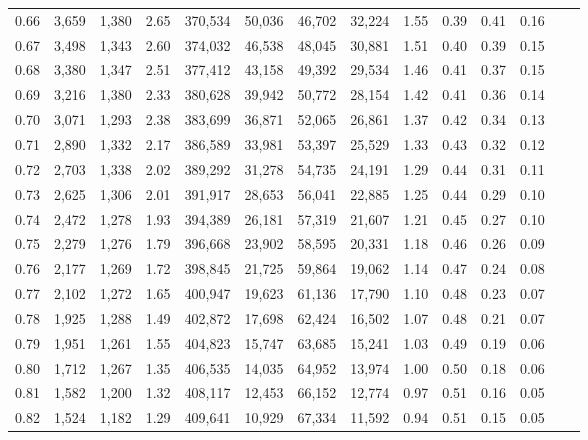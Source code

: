 \begin{tabular}{rrrrrrrrrrrrrr}
0.66 &  3,659 &  1,380 &    2.65 &  370,534 &   50,036 &  46,702 &  32,224 &  1.55 &  0.39 &  0.41 &      0.16 \\
0.67 &  3,498 &  1,343 &    2.60 &  374,032 &   46,538 &  48,045 &  30,881 &  1.51 &  0.40 &  0.39 &      0.15 \\
0.68 &  3,380 &  1,347 &    2.51 &  377,412 &   43,158 &  49,392 &  29,534 &  1.46 &  0.41 &  0.37 &      0.15 \\
0.69 &  3,216 &  1,380 &    2.33 &  380,628 &   39,942 &  50,772 &  28,154 &  1.42 &  0.41 &  0.36 &      0.14 \\
0.70 &  3,071 &  1,293 &    2.38 &  383,699 &   36,871 &  52,065 &  26,861 &  1.37 &  0.42 &  0.34 &      0.13 \\
0.71 &  2,890 &  1,332 &    2.17 &  386,589 &   33,981 &  53,397 &  25,529 &  1.33 &  0.43 &  0.32 &      0.12 \\
0.72 &  2,703 &  1,338 &    2.02 &  389,292 &   31,278 &  54,735 &  24,191 &  1.29 &  0.44 &  0.31 &      0.11 \\
0.73 &  2,625 &  1,306 &    2.01 &  391,917 &   28,653 &  56,041 &  22,885 &  1.25 &  0.44 &  0.29 &      0.10 \\
0.74 &  2,472 &  1,278 &    1.93 &  394,389 &   26,181 &  57,319 &  21,607 &  1.21 &  0.45 &  0.27 &      0.10 \\
0.75 &  2,279 &  1,276 &    1.79 &  396,668 &   23,902 &  58,595 &  20,331 &  1.18 &  0.46 &  0.26 &      0.09 \\
0.76 &  2,177 &  1,269 &    1.72 &  398,845 &   21,725 &  59,864 &  19,062 &  1.14 &  0.47 &  0.24 &      0.08 \\
0.77 &  2,102 &  1,272 &    1.65 &  400,947 &   19,623 &  61,136 &  17,790 &  1.10 &  0.48 &  0.23 &      0.07 \\
0.78 &  1,925 &  1,288 &    1.49 &  402,872 &   17,698 &  62,424 &  16,502 &  1.07 &  0.48 &  0.21 &      0.07 \\
0.79 &  1,951 &  1,261 &    1.55 &  404,823 &   15,747 &  63,685 &  15,241 &  1.03 &  0.49 &  0.19 &      0.06 \\
0.80 &  1,712 &  1,267 &    1.35 &  406,535 &   14,035 &  64,952 &  13,974 &  1.00 &  0.50 &  0.18 &      0.06 \\
0.81 &  1,582 &  1,200 &    1.32 &  408,117 &   12,453 &  66,152 &  12,774 &  0.97 &  0.51 &  0.16 &      0.05 \\
0.82 &  1,524 &  1,182 &    1.29 &  409,641 &   10,929 &  67,334 &  11,592 &  0.94 &  0.51 &  0.15 &      0.05 \\

\end{tabular}
